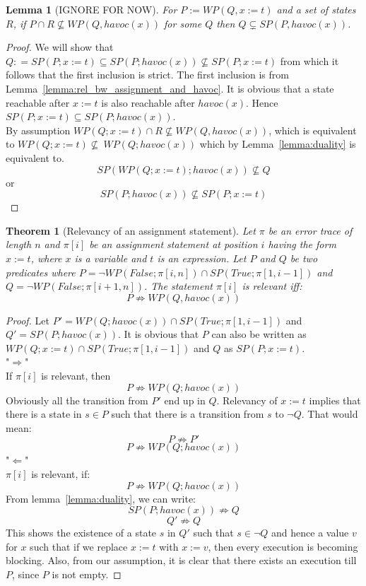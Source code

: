 \documentclass{article}
\newcommand{\limp}{\Rightarrow}
\newcommand{\WP}[2]{\mathit{WP}(#1,#2)}
\newcommand{\SP}[2]{\mathit{SP}(#1,#2)}
\newcommand{\havoc}{\mathit{havoc}}
\newtheorem{theorem}{Theorem}
\newtheorem{lemma}{Lemma}
\begin{document}
\begin{lemma}[IGNORE FOR NOW]\label{lemma:nonempty_post}
	For $P := \WP{Q}{x := t}$ and a set of states $R$, if $ P \cap R \nsubseteq \WP{Q}{\havoc(x)}$ for some $Q$ then $Q \subsetneq \SP{P}{\havoc(x)}$.
\end{lemma}
\begin{proof}
	We will show that $Q : =SP(P; x:=t) \subseteq SP(P;havoc(x)) \not\subseteq SP(P; x:=t)$ from which it follows that the first inclusion is strict.
	The first inclusion is from Lemma~\ref{lemma:rel_bw_assignment_and_havoc}. It is obvious that a state reachable after $x:=t$ is also reachable 
	after $havoc(x)$. Hence $SP(P; x:=t) \subseteq SP(P;havoc(x))$. \\
	By assumption $WP(Q;x:=t) \cap R \not\subseteq \WP{Q}{\havoc(x)}$, which is equivalent to $WP(Q; x:=t) \not \subseteq \ WP(Q; havoc(x))$ which by Lemma~\ref{lemma:duality} is equivalent to.
	$$SP(WP(Q;x:=t); havoc(x)) \not\subseteq Q$$
	or 
	$$SP(P;havoc(x)) \not\subseteq SP(P; x:=t)$$
\end{proof}

\begin{theorem}[Relevancy of an assignment statement]\label{mydef:relevancytheorem}
Let $\pi$ be an error trace of length $n$ and $\pi[i]$ be an assignment statement at position $i$ having the form $x:=t$, where $x$ is a variable and $t$ is an expression. Let $P$ and $Q$ be two predicates where $P = \neg WP(False; \pi[i,n]) \cap SP(True; \pi[1,i-1])$ and $Q =  \neg WP(False; \pi[i+1,n])$. The statement $\pi[i]$ is relevant iff:
 $$P \not \limp WP(Q,havoc(x))$$
\end{theorem}

\begin{proof}
Let $P' = WP(Q;havoc(x)) \cap SP(True; \pi[1,i-1])$ and $Q'=SP(P;havoc(x))$. It is obvious that $P$ can also be written as $WP(Q;x:=t) \cap SP(True; \pi[1,i-1])$ and $Q$ as $SP(P;x:=t)$.\\
"$\Rightarrow$"\\
If $\pi[i]$ is relevant, then\\
$$P \not \limp WP(Q;havoc(x))$$
Obviously all the transition from $P'$ end up in $Q$. Relevancy of $x:=t$ implies that there is a state in $s \in P$ such that there is a transition from $s$ to $\neg Q$. That would mean:
$$P \not \limp P'$$
$$P \not \limp WP(Q;havoc(x))$$
"$\Leftarrow$"\\
$\pi[i]$ is relevant, if:
$$P \not \limp WP(Q;havoc(x))$$
From lemma~\ref{lemma:duality}, we can write:
$$SP(P; havoc(x)) \not \limp Q$$
$$Q' \not \limp Q$$
This shows the existence of a state $s$ in $Q'$ such that $s\in \neg Q$ and hence a value $v$ for $x$ such that if we replace $x:=t$ with $x:=v$, then every execution is becoming blocking. Also, from our assumption, it is clear that there exists an execution till $P$, since $P$ is not empty.


\end{proof}
\end{document}
